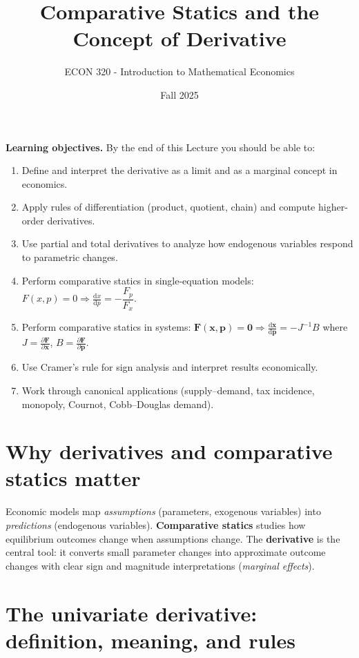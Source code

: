 \documentclass[11pt]{article}
\title{Comparative Statics and the Concept of Derivative} %
\author{ECON 320 - Introduction to Mathematical Economics}
\date{Fall 2025}
\newcommand{\ve}[1]{\mathbf{#1}}
\newcommand{\pd}[2]{\frac{\partial #1}{\partial #2}}
\newcommand{\dtotal}[2]{\frac{\mathrm{d} #1}{\mathrm{d} #2}}
\begin{document}
\maketitle

\begin{tcolorbox}[sectionbox]
\textbf{Learning objectives.} By the end of this Lecture you should be able to:
\begin{enumerate}[label=\arabic*.]
  \item Define and interpret the derivative as a limit and as a marginal concept in economics.
  \item Apply rules of differentiation (product, quotient, chain) and compute higher-order derivatives.
  \item Use partial and total derivatives to analyze how endogenous variables respond to parametric changes.
  \item Perform comparative statics in single-equation models: \(F(x,p)=0 \Rightarrow \dtotal{x}{p} = -\dfrac{F_p}{F_x}\).
  \item Perform comparative statics in systems: \(\ve F(\ve x,\ve p)=\ve 0 \Rightarrow \dtotal{\ve x}{\ve p}=-J^{-1}B\) where \(J=\pd{\ve F}{\ve x}\), \(B=\pd{\ve F}{\ve p}\).
  \item Use Cramer's rule for sign analysis and interpret results economically.
  \item Work through canonical applications (supply--demand, tax incidence, monopoly, Cournot, Cobb--Douglas demand).
\end{enumerate}
\end{tcolorbox}

\newpage
\tableofcontents

\newpage

\section{Why derivatives and comparative statics matter}
Economic models map \emph{assumptions} (parameters, exogenous variables) into \emph{predictions} (endogenous variables). \textbf{Comparative statics} studies how equilibrium outcomes change when assumptions change. The \textbf{derivative} is the central tool: it converts small parameter changes into approximate outcome changes with clear sign and magnitude interpretations (\emph{marginal effects}).



\section{The univariate derivative: definition, meaning, and rules}
\end{document}
